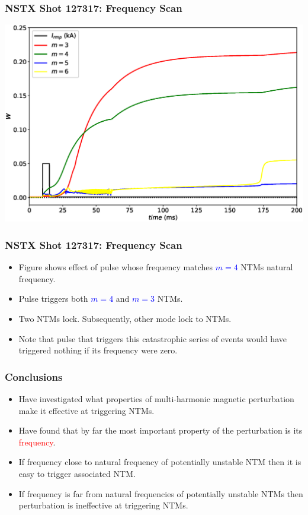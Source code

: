 \documentclass{beamer}
\newcommand{\blue}[1]{\textcolor{blue}{#1}}
\newcommand{\red}[1]{\textcolor{red}{#1}}
\begin{document}
\begin{frame}
\frametitle{NSTX Shot 127317: Frequency Scan}

\begin{center}
\includegraphics[width=\textwidth]{Waveform2.eps}
\end{center}

\end{frame}

\begin{frame}
\frametitle{NSTX Shot 127317: Frequency Scan}
\begin{itemize}
\item Figure shows effect of pulse whose frequency matches \blue{$m=4$} NTMs natural frequency.
\item Pulse triggers both \blue{$m=4$} and \blue{$m=3$} NTMs.
\item Two NTMs lock. Subsequently, other mode lock to NTMs. 
\item Note that pulse that triggers this catastrophic series of events would have triggered nothing
if its frequency were zero. 
\end{itemize}
\end{frame}

\begin{frame}
\frametitle{Conclusions}
\begin{itemize}
\item Have investigated what properties of multi-harmonic magnetic perturbation make it effective at
triggering NTMs.
\item Have found that by far the most important property of the perturbation is its \red{frequency}.
\item If frequency close to natural frequency of potentially unstable NTM then it is easy to trigger associated NTM.
\item If frequency is far from natural frequencies of potentially unstable NTMs then perturbation is ineffective at
triggering NTMs.
\end{itemize}
\end{frame}
\end{document}
